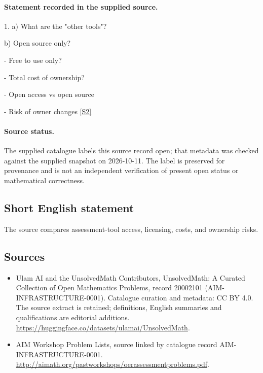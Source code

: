 \documentclass[11pt]{article}
\begin{document}
\paragraph{Statement recorded in the supplied source.}
1. a) What are the "other tools"?

b) Open source only?

- Free to use only?

- Total cost of ownership?

- Open access vs open source

- Risk of owner changes \href{http://aimath.org/pastworkshops/oerassessmentproblems.pdf}{[S2]}
\paragraph{Source status.}
The supplied catalogue labels this source record open; that metadata was checked against the supplied snapshot on 2026-10-11. The label is preserved for provenance and is not an independent verification of present open status or mathematical correctness.
\subsection{Short English statement}
The source compares assessment-tool access, licensing, costs, and ownership risks.
\subsection{Sources}
\begin{itemize}
\item[S1] Ulam AI and the UnsolvedMath Contributors, UnsolvedMath: A Curated Collection of Open Mathematics Problems, record 20002101 (AIM-INFRASTRUCTURE-0001). Catalogue curation and metadata: CC BY 4.0. The source extract is retained; definitions, English summaries and qualifications are editorial additions.
\url{https://huggingface.co/datasets/ulamai/UnsolvedMath}.
\item[S2] AIM Workshop Problem Lists, source linked by catalogue record AIM-INFRASTRUCTURE-0001.
\url{http://aimath.org/pastworkshops/oerassessmentproblems.pdf}.
\end{itemize}
\end{document}
